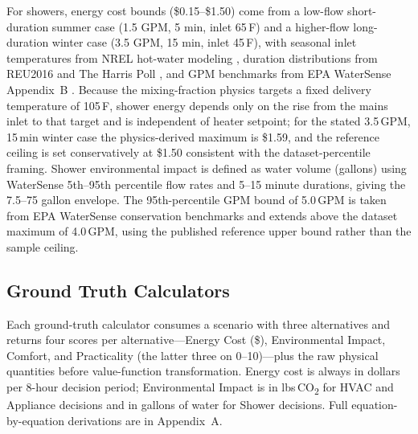 \documentclass[final,3p,times]{elsarticle}
\begin{document}
For showers, energy cost bounds (\$0.15--\$1.50) come from a low-flow short-duration summer case (1.5 GPM, 5 min, inlet 65\,\textdegree{}F) and a higher-flow long-duration winter case (3.5 GPM, 15 min, inlet 45\,\textdegree{}F), with seasonal inlet temperatures from NREL hot-water modeling \cite{hendron2008}, duration distributions from REU2016 \cite{reu2016} and The Harris Poll \cite{harrispoll2024}, and GPM benchmarks from EPA WaterSense Appendix~B \cite{epawatersense}. Because the mixing-fraction physics targets a fixed delivery temperature of 105\,\textdegree{}F, shower energy depends only on the rise from the mains inlet to that target and is independent of heater setpoint; for the stated 3.5\,GPM, 15\,min winter case the physics-derived maximum is \$1.59, and the reference ceiling is set conservatively at \$1.50 consistent with the dataset-percentile framing. Shower environmental impact is defined as water volume (gallons) using WaterSense 5th--95th percentile flow rates and 5--15 minute durations, giving the 7.5--75 gallon envelope. The 95th-percentile GPM bound of 5.0\,GPM is taken from EPA WaterSense conservation benchmarks \cite{epawatersense} and extends above the dataset maximum of 4.0\,GPM, using the published reference upper bound rather than the sample ceiling.

\subsection{Ground Truth Calculators}
\label{sec:gt-calculators}

Each ground-truth calculator consumes a scenario with three alternatives and returns four
scores per alternative---Energy Cost (\$), Environmental Impact, Comfort, and Practicality
(the latter three on 0--10)---plus the raw physical quantities before value-function
transformation. Energy cost is always in dollars per 8-hour decision period; Environmental
Impact is in lbs\,CO\textsubscript{2} for HVAC and Appliance decisions and in gallons of
water for Shower decisions. Full equation-by-equation derivations are in Appendix~A.
\end{document}
